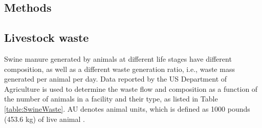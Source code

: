 \begin{refsection}[referencesCh6]

\section{Methods}
\subsection{Livestock waste}
Swine manure generated by animals at different life stages have different composition, as well as a different waste generation ratio, i.e., waste mass generated per animal per day. Data reported by the US Department of Agriculture \citep{USDAWaste, Kellog2000} is used to determine the waste flow and composition as a function of the number of animals in a facility and their type, as listed in Table \ref{table:SwineWaste}. AU denotes animal units, which is defined as 1000 pounds (453.6 kg) of live animal \citep{animal_unit_definition}.


\end{refsection}
